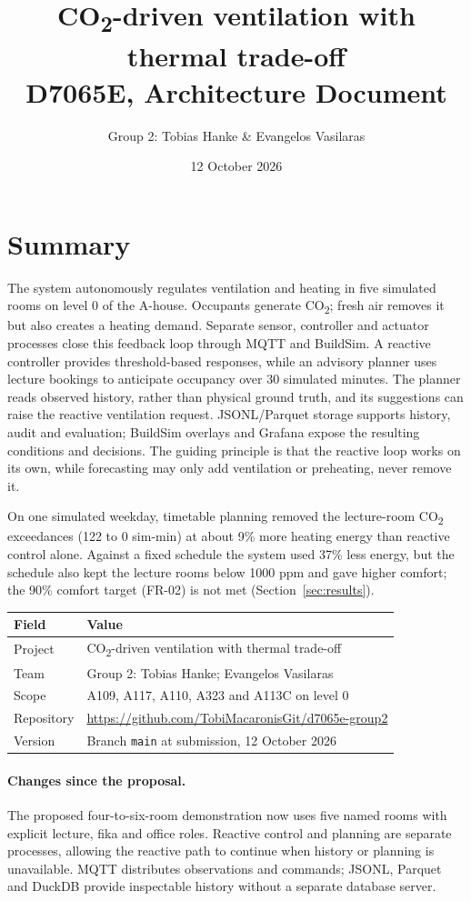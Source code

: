 \documentclass[11pt,a4paper]{article}
\title{CO\textsubscript{2}-driven ventilation with thermal trade-off\\\large D7065E, Architecture Document}
\author{Group 2: Tobias Hanke \& Evangelos Vasilaras}
\date{12 October 2026}
\begin{document}
{\let\newpage\relax\maketitle}
\tableofcontents
\newpage
\section{Summary}
The system autonomously regulates ventilation and heating in five simulated rooms on level 0 of the A-house. Occupants generate CO\textsubscript{2}; fresh air removes it but also creates a heating demand. Separate sensor, controller and actuator processes close this feedback loop through MQTT and BuildSim. A reactive controller provides threshold-based responses, while an advisory planner uses lecture bookings to anticipate occupancy over 30 simulated minutes. The planner reads observed history, rather than physical ground truth, and its suggestions can raise the reactive ventilation request. JSONL/Parquet storage supports history, audit and evaluation; BuildSim overlays and Grafana expose the resulting conditions and decisions. The guiding principle is that the reactive loop works on its own, while forecasting may only add ventilation or preheating, never remove it.

On one simulated weekday, timetable planning removed the lecture-room CO\textsubscript{2} exceedances (122 to 0 sim-min) at about 9\% more heating energy than reactive control alone. Against a fixed schedule the system used 37\% less energy, but the schedule also kept the lecture rooms below 1000 ppm and gave higher comfort; the 90\% comfort target (FR-02) is not met (Section~\ref{sec:results}).

\noindent\begin{tabularx}{\linewidth}{lX}\toprule Field & Value\\\midrule
Project & CO\textsubscript{2}-driven ventilation with thermal trade-off\\
Team & Group 2: Tobias Hanke; Evangelos Vasilaras\\
Scope & A109, A117, A110, A323 and A113C on level 0\\
Repository & \url{https://github.com/TobiMacaronisGit/d7065e-group2}\\
Version & Branch \texttt{main} at submission, 12 October 2026\\\bottomrule
\end{tabularx}

\paragraph{Changes since the proposal.}
The proposed four-to-six-room demonstration now uses five named rooms with explicit lecture, fika and office roles. Reactive control and planning are separate processes, allowing the reactive path to continue when history or planning is unavailable. MQTT distributes observations and commands; JSONL, Parquet and DuckDB provide inspectable history without a separate database server.
\end{document}
